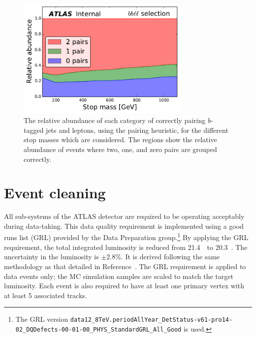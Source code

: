 \begin{figure}[ht]
  \centering
  \includegraphics[width=0.75\textwidth]
    {figs/blstop/PairingEfficiencies/pairing_abundance__inclusive.pdf}
  \caption{The relative abundance of each category of correctly pairing
    $b$-tagged jets and leptons, using the pairing heuristic, for the different
    stop masses which are considered.
    The regions show the relative abundance of events where two, one, and zero
    pairs are grouped correctly.
  }
  \label{fig:pairing_eff}
\end{figure}

\FloatBarrier
\section{Event cleaning}
\label{sec:event_cleaning}

All sub-systems of the ATLAS detector are required to be operating acceptably
during data-taking. 
This data quality requirement is implemented using a good runs list (GRL)
provided by the Data Preparation group.\footnote{The GRL version
\texttt{data12\_8TeV.periodAllYear\_DetStatus-v61-pro14-02\_DQDefects-00-01-00\_PHYS\_StandardGRL\_All\_Good}
is used.}
By applying the GRL requirement, the total integrated luminosity is reduced
from 21.4~\ifb\ to 20.3~\ifb.
The uncertainty in the luminosity is $\pm 2.8$\%.
It is derived following the same methodology as that detailed
in Reference~\cite{Lumi}.
The GRL requirement is applied to data events only; the MC simulation samples
are scaled to match the target luminosity.
Each event is also required to have at least one primary vertex with at least
5 associated tracks.

